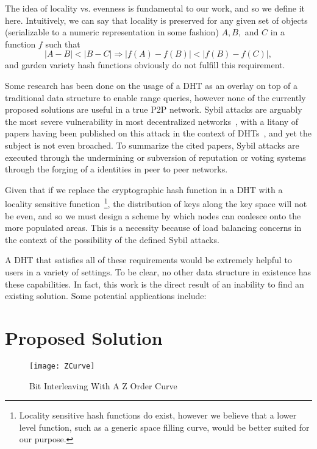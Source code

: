 \documentclass[12pt]{IEEEtran}
\begin{document}
The idea of locality vs. evenness is fundamental to our work, and so we define it here. Intuitively, we can say that locality is preserved for any given set of objects (serializable to a numeric representation in some fashion) $A,B,$ and $C$ in a function $f$ such that
\begin{equation} \label{eq:locality}
|A-B| < |B-C| \Rightarrow |f(A)-f(B)| < |f(B) - f(C)|,
\end{equation}
and garden variety hash functions obviously do not fulfill this requirement.

\par Some research has been done on the usage of a DHT as an overlay on top of a traditional data structure to enable range queries, however none of the currently proposed solutions are useful in a true P2P network. Sybil attacks are arguably the most severe vulnerability in most decentralized networks~, with a litany of papers having been published on this attack in the context of DHTs~, and yet the subject is not even broached. To summarize the cited papers, Sybil attacks are executed through the undermining or subversion of reputation or voting systems through the forging of a identities in peer to peer networks.

\par Given that if we replace the cryptographic hash function in a DHT with a locality sensitive function~\footnote{Locality sensitive hash functions do exist, however we believe that a lower level function, such as a generic space filling curve, would be better suited for our purpose.}, the distribution of keys along the key space will not be even, and so we must design a scheme by which nodes can coalesce onto the more populated areas. This is a necessity because of load balancing concerns in the context of the possibility of the defined Sybil attacks.

\par A DHT that satisfies all of these requirements would be extremely helpful to users in a variety of settings. To be clear, no other data structure in existence has these capabilities. In fact, this work is the direct result of an inability to find an existing solution. Some potential applications include:



\section{Proposed Solution}
\begin{figure}[!t]
\centering
\texttt{[image: ZCurve]}
\caption{Bit Interleaving With A Z Order Curve}
\label{fig_ZOrd}
\end{figure}
\end{document}
